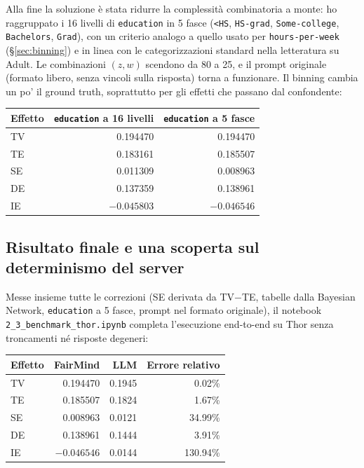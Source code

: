 Alla fine la soluzione è stata ridurre la complessità combinatoria a monte: ho raggruppato i 16 livelli di \texttt{education} in 5 fasce (\texttt{<HS}, \texttt{HS-grad}, \texttt{Some-college}, \texttt{Bachelors}, \texttt{Grad}), con un criterio analogo a quello usato per \texttt{hours-per-week} (\S\ref{sec:binning}) e in linea con le categorizzazioni standard nella letteratura su Adult. Le combinazioni $(z,w)$ scendono da 80 a 25, e il prompt originale (formato libero, senza vincoli sulla risposta) torna a funzionare. Il binning cambia un po' il ground truth, soprattutto per gli effetti che passano dal confondente:

\begin{center}
\begin{tabular}{lrr}
\toprule
Effetto & \texttt{education} a 16 livelli & \texttt{education} a 5 fasce \\
\midrule
TV & 0.194470 & 0.194470 \\
TE & 0.183161 & 0.185507 \\
SE & 0.011309 & 0.008963 \\
DE & 0.137359 & 0.138961 \\
IE & $-0.045803$ & $-0.046546$ \\
\bottomrule
\end{tabular}
\end{center}

\subsection*{Risultato finale e una scoperta sul determinismo del server}

Messe insieme tutte le correzioni (SE derivata da TV$-$TE, tabelle dalla Bayesian Network, \texttt{education} a 5 fasce, prompt nel formato originale), il notebook \texttt{2\_3\_benchmark\_thor.ipynb} completa l'esecuzione end-to-end su Thor senza troncamenti né risposte degeneri:

\begin{center}
\begin{tabular}{lrrr}
\toprule
Effetto & FairMind & LLM & Errore relativo \\
\midrule
TV & 0.194470 & 0.1945 & 0.02\% \\
TE & 0.185507 & 0.1824 & 1.67\% \\
SE & 0.008963 & 0.0121 & 34.99\% \\
DE & 0.138961 & 0.1444 & 3.91\% \\
IE & $-0.046546$ & 0.0144 & 130.94\% \\
\bottomrule
\end{tabular}
\end{center}

